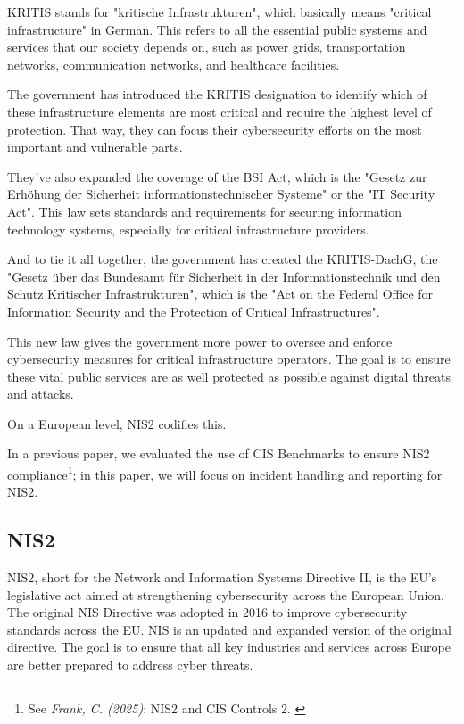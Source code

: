 KRITIS stands for "kritische Infrastrukturen", which basically means "critical infrastructure" in German. This refers to all the essential public systems and services that our society depends on, such as power grids, transportation networks, communication networks, and healthcare facilities.

The government has introduced the KRITIS designation to identify which of these infrastructure elements are most critical and require the highest level of protection. That way, they can focus their cybersecurity efforts on the most important and vulnerable parts.

They've also expanded the coverage of the BSI Act, which is the "Gesetz zur Erhöhung der Sicherheit informationstechnischer Systeme" or the "IT Security Act". This law sets standards and requirements for securing information technology systems, especially for critical infrastructure providers.

And to tie it all together, the government has created the KRITIS-DachG, the "Gesetz über das Bundesamt für Sicherheit in der Informationstechnik und den Schutz Kritischer Infrastrukturen", which is the "Act on the Federal Office for Information Security and the Protection of Critical Infrastructures".

This new law gives the government more power to oversee and enforce cybersecurity measures for critical infrastructure operators. The goal is to ensure these vital public services are as well protected as possible against digital threats and attacks.

On a European level, NIS2 codifies this.

In a previous paper, we evaluated the use of CIS Benchmarks to ensure NIS2 compliance\footnote{See \textit{Frank, C. (2025)}: NIS2 and CIS Controls 2. \cite{previousPaper}}; in this paper, we will focus on incident handling and reporting for NIS2.

\subsection{NIS2}

NIS2, short for the Network and Information Systems Directive II, is the EU's legislative act aimed at strengthening cybersecurity across the European Union. The original NIS Directive was adopted in 2016 to improve cybersecurity standards across the EU. NIS is an updated and expanded version of the original directive. The goal is to ensure that all key industries and services across Europe are better prepared to address cyber threats.


